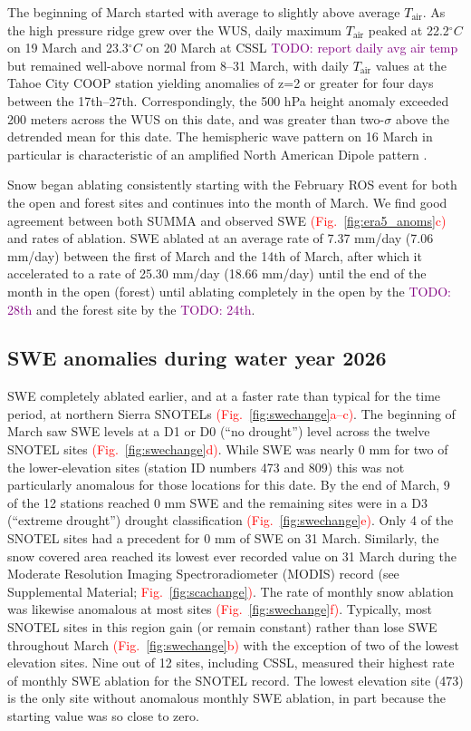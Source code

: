 \documentclass[draft]{agujournal2019}
\newcommand{\fig}[2]{\textcolor{red}{(Fig.~\ref{#1}{#2})}}   %
\newcommand{\fignop}[2]{\textcolor{red}{Fig.~\ref{#1}{#2}}}  %
\newcommand{\todo}[1]{\textcolor{purple}{TODO: #1}}      %
\newcommand{\tair}{\textcolor{black}{$T_{\mathrm{air}}$}\xspace}
\begin{document}
The beginning of March started with average to slightly above average \tair.
As the high pressure ridge grew over the WUS, daily maximum \tair peaked at 22.2$^{\circ}C$ on 19 March and 23.3$^{\circ}C$ on 20 March at CSSL \todo{report daily avg air temp} but remained well-above normal from 8--31 March, with daily \tair values at the Tahoe City COOP station yielding anomalies of z=2 or greater for four days between the 17th--27th.
Correspondingly, the 500 hPa height anomaly exceeded 200 meters across the WUS on this date, and was greater than two-$\sigma$ above the detrended mean for this date.
The hemispheric wave pattern on 16 March in particular is characteristic of an amplified North American Dipole pattern \cite{Wang2014,Wang2015,Singh2016-ev}.

Snow began ablating consistently starting with the February ROS event for both the open and forest sites and continues into the month of March.
We find good agreement between both SUMMA and observed SWE \fig{fig:era5_anoms}{c} and rates of ablation.
SWE ablated at an average rate of 7.37 mm/day (7.06 mm/day) between the first of March and the 14th of March, after which it accelerated to a rate of 25.30 mm/day (18.66 mm/day) until the end of the month in the open (forest) until ablating completely in the open by the \todo{28th} and the forest site by the \todo{24th}.


\subsection{SWE anomalies during water year 2026}\label{sec:swe_anomalies}

SWE completely ablated earlier, and at a faster rate than typical for the time period, at northern Sierra SNOTELs \fig{fig:swechange}{a--c}.
The beginning of March saw SWE levels at a D1 or D0 (``no drought'') level across the twelve SNOTEL sites \fig{fig:swechange}{d}.
While SWE was nearly 0 mm for two of the lower-elevation sites (station ID numbers 473 and 809) this was not particularly anomalous for those locations for this date.
By the end of March, 9 of the 12 stations reached 0 mm SWE and the remaining sites were in a D3 (``extreme drought'') drought classification \fig{fig:swechange}{e}.
Only 4 of the SNOTEL sites had a precedent for 0 mm of SWE on 31 March.
Similarly, the snow covered area reached its lowest ever recorded value on 31 March during the Moderate Resolution Imaging Spectroradiometer (MODIS) record (see Supplemental Material; \fignop{fig:scachange}).
The rate of monthly snow ablation was likewise anomalous at most sites \fig{fig:swechange}{f}.
Typically, most SNOTEL sites in this region gain (or remain constant) rather than lose SWE throughout March \fig{fig:swechange}{b} with the exception of two of the lowest elevation sites.
Nine out of 12 sites, including CSSL, measured their highest rate of monthly SWE ablation for the SNOTEL record.
The lowest elevation site (473) is the only site without anomalous monthly SWE ablation, in part because the starting value was so close to zero.
\end{document}
